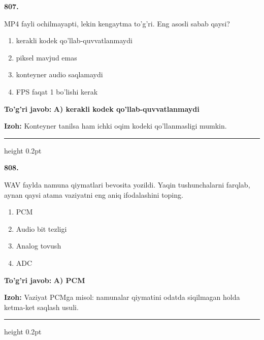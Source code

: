 \documentclass[10pt,a4paper,oneside]{article}
\begin{document}
\noindent\textbf{\color{ink}807.}
\par
MP4 fayli ochilmayapti, lekin kengaytma to'g'ri. Eng asosli sabab qaysi?
\begin{enumerate}[label=\Alph*),leftmargin=9mm]
\item kerakli kodek qo'llab-quvvatlanmaydi
\item piksel mavjud emas
\item konteyner audio saqlamaydi
\item FPS faqat 1 bo'lishi kerak
\end{enumerate}
\begin{tcolorbox}[enhanced,breakable,colback=teal!4,colframe=teal!50!black,boxrule=0.5pt,arc=1.1mm,left=3mm,right=3mm,top=1.7mm,bottom=1.7mm,before skip=2mm,after skip=2mm]
\textbf{\color{teal}To'g'ri javob:} \textbf{A) kerakli kodek qo'llab-quvvatlanmaydi}
\par\smallskip
\textbf{Izoh:} Konteyner tanilsa ham ichki oqim kodeki qo'llanmasligi mumkin.
\end{tcolorbox}
\vspace{2mm}\hrule height 0.2pt \vspace{3mm}

\noindent\textbf{\color{ink}808.}
\par
WAV faylda namuna qiymatlari bevosita yozildi. Yaqin tushunchalarni farqlab, aynan qaysi atama vaziyatni eng aniq ifodalashini toping.
\begin{enumerate}[label=\Alph*),leftmargin=9mm]
\item PCM
\item Audio bit tezligi
\item Analog tovush
\item ADC
\end{enumerate}
\begin{tcolorbox}[enhanced,breakable,colback=teal!4,colframe=teal!50!black,boxrule=0.5pt,arc=1.1mm,left=3mm,right=3mm,top=1.7mm,bottom=1.7mm,before skip=2mm,after skip=2mm]
\textbf{\color{teal}To'g'ri javob:} \textbf{A) PCM}
\par\smallskip
\textbf{Izoh:} Vaziyat PCMga misol: namunalar qiymatini odatda siqilmagan holda ketma-ket saqlash usuli.
\end{tcolorbox}
\vspace{2mm}\hrule height 0.2pt \vspace{3mm}
\end{document}
